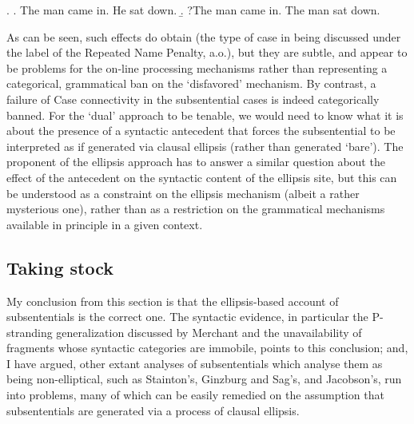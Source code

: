 \documentclass[doublespace]{umthesis}
\begin{document}
\ex. 	\a. The man came in. He sat down.
	\b. ?The man came in. The man sat down.
	
As can be seen, such effects do obtain (the type of case in \Last being discussed under the label of the Repeated Name Penalty, \cite{GGG93} a.o.), but they are subtle, and appear to be problems for the on-line processing mechanisms rather than representing a categorical, grammatical ban on the `disfavored' mechanism. By contrast, a failure of Case connectivity in the subsentential cases is indeed categorically banned. For the `dual' approach to be tenable, we would need to know what it is about the presence of a syntactic antecedent that forces the subsentential to be interpreted as if generated via clausal ellipsis (rather than generated `bare'). The proponent of the ellipsis approach has to answer a similar question about the effect of the antecedent on the syntactic content of the ellipsis site, but this can be understood as a constraint on the ellipsis mechanism (albeit a rather mysterious one), rather than as a restriction on the grammatical mechanisms available in principle in a given context.



\subsection{Taking stock}

 My conclusion from this section is that the ellipsis-based account of subsententials is the correct one. The syntactic evidence, in particular the P-stranding generalization discussed by Merchant and the unavailability of fragments whose syntactic categories are immobile, points to this conclusion; and, I have argued, other extant analyses of subsententials which analyse them as being non-elliptical, such as Stainton's, Ginzburg and Sag's, and Jacobson's, run into problems, many of which can be easily remedied on the assumption that subsententials are generated via a process of clausal ellipsis.
\end{document}
